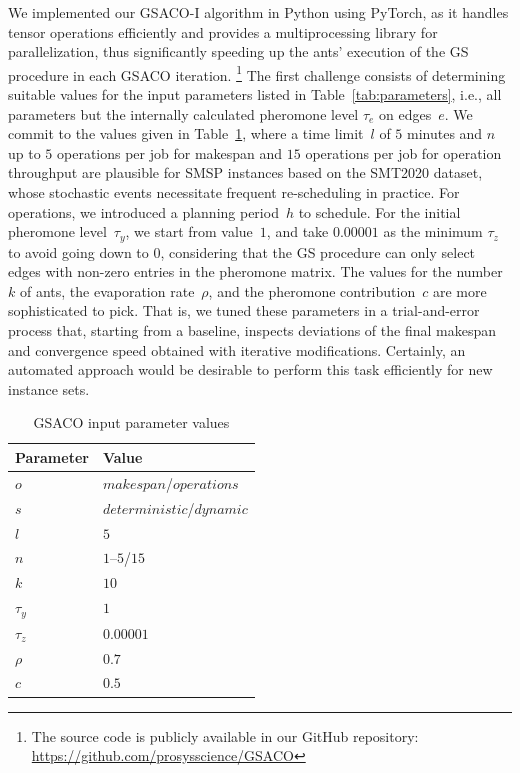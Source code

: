 We implemented our GSACO-I algorithm in Python using PyTorch, as it handles tensor operations efficiently and provides a multiprocessing library for
parallelization, thus significantly speeding up the ants' execution of the GS procedure in each GSACO iteration.%
\footnote{The source code is publicly available in our GitHub repository:
	\url{https://github.com/prosysscience/GSACO}}
The first challenge consists of determining suitable values for the input
parameters listed in Table~\ref{tab:parameters}, i.e.,
all parameters but the internally calculated pheromone level $\tau_e$ on edges~$e$.
We commit to the values given in Table~\ref{tab:p_value},
where a time limit~$l$ of $5$ minutes and $n$
up to $5$ operations per job for makespan and $15$ operations per job for operation throughput are plausible for SMSP instances
based on the SMT2020 dataset, whose stochastic events necessitate frequent
re-scheduling in practice. For operations, we introduced a planning period~$h$ to schedule. 
For the initial pheromone level~$\tau_y$,
we start from value~$1$, and take $0.00001$ as the minimum $\tau_z$
to avoid going down to $0$, considering that the GS procedure can only
select edges with non-zero entries in the pheromone matrix.
The values for the number~$k$ of ants, the evaporation rate~$\rho$,
and the pheromone contribution~$c$ are more sophisticated to pick.
That is, we tuned these parameters in a trial-and-error process that,
starting from a baseline, inspects deviations of the final makespan and convergence speed obtained with iterative modifications.
Certainly, an automated approach would be desirable to
perform this task efficiently for new instance sets.%
%
\begin{table}[t]
	\caption{GSACO input parameter values}\label{tab:p_value} \centering
	\begin{tabular}{|l|l|}
		\hline
		Parameter & Value \\ \hline
		$o$ & $makespan$/$operations$        \\
		$s$ & $deterministic$/$dynamic$        \\
		$l$ & $5$        \\
		$n$ & $1$--$5$/$15$ \\
		$k$ & $10$ \\
		$\tau_{y}$ & $1$ \\
		$\tau_{z}$ & $0.00001$ \\
		$\rho$ & $0.7$ \\
		$c$ & $0.5$ \\
		\hline
	\end{tabular}
\end{table}



